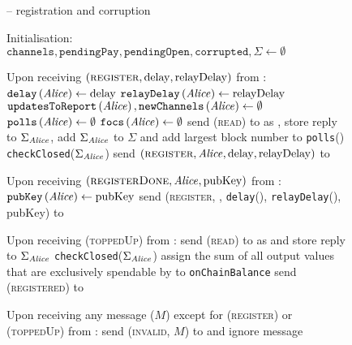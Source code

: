   \begin{figure}[H]
    \begin{systembox}{\fpaynet{} -- registration and corruption}
      \begin{algorithmic}[1]
        \State Initialisation:
        \Indent
          \State $\mathtt{channels}, \mathtt{pendingPay}, \mathtt{pendingOpen},
          \mathtt{corrupted}, \Sigma \gets \emptyset$
        \EndIndent
        \Statex

        \State Upon receiving $\left(\textsc{register}, \mathrm{delay},
        \mathrm{relayDelay}\right)$ from \alice:
        \Indent
          \State $\mathtt{delay}\left(\mathit{Alice}\right) \gets \mathrm{delay}$
          \State $\mathtt{relayDelay}\left(\mathit{Alice}\right) \gets
          \mathrm{relayDelay}$
          \State $\mathtt{updatesToReport}\left(\mathit{Alice}\right),
          \mathtt{newChannels}\left(\mathit{Alice}\right) \gets \emptyset$
          \State $\mathtt{polls}\left(\mathit{Alice}\right) \gets \emptyset$
          \State $\mathtt{focs}\left(\mathit{Alice}\right) \gets \emptyset$
          \State send (\textsc{read}) to \ledger{} as \alice{}, store reply to
          $\Sigma_{\mathit{Alice}}$, add $\Sigma_{\mathit{Alice}}$ to $\Sigma$ and add largest
          block number to \texttt{polls}(\alice)
          \label{alg:fpaynet:support:read}
          \State \texttt{checkClosed}($\Sigma_{\mathit{Alice}}$)
          \State send $\left(\textsc{register}, \mathit{Alice}, \mathrm{delay},
          \mathrm{relayDelay}\right)$ to \simulator
        \EndIndent
        \Statex

        \State Upon receiving $\left(\textsc{registerDone}, \mathit{Alice},
        \mathrm{pubKey}\right)$ from \simulator:
        \Indent
          \State $\mathtt{pubKey}\left(\mathit{Alice}\right) \gets \mathrm{pubKey}$
          \State send (\textsc{register}, \alice, \texttt{delay}(\alice),
          \texttt{relayDelay}(\alice), pubKey) to \alice
        \EndIndent
        \Statex

        \State Upon receiving (\textsc{toppedUp}) from \alice:
        \Indent
          \State send (\textsc{read}) to \ledger{} as \alice{} and store reply
          to $\Sigma_{\mathit{Alice}}$
          \State \texttt{checkClosed}($\Sigma_{\mathit{Alice}}$)
          \State assign the sum of all output values that are exclusively
          spendable by \alice{} to \texttt{onChainBalance}
          \State send (\textsc{registered}) to \alice
        \EndIndent
        \Statex

        \State Upon receiving any message ($M$) except for (\textsc{register})
        or (\textsc{toppedUp}) from \alice:
        \Indent
            \State send (\textsc{invalid}, $M$) to \alice{} and ignore message
          \EndIf
          \label{alg:fpaynet:support:unreg}
        \EndIndent
        \Statex


\end{algorithmic}
\end{systembox}
\end{figure}
